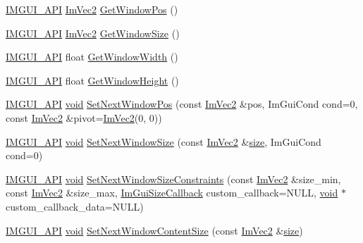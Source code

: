 \begin{DoxyCompactItemize}
\hyperlink{imgui_8h_a43829975e84e45d1149597467a14bbf5}{I\+M\+G\+U\+I\+\_\+\+A\+PI} \hyperlink{structImVec2}{Im\+Vec2} \hyperlink{namespaceImGui_a413d939f3ef416a47d6e5b48be955146}{Get\+Window\+Pos} ()
\item 
\hyperlink{imgui_8h_a43829975e84e45d1149597467a14bbf5}{I\+M\+G\+U\+I\+\_\+\+A\+PI} \hyperlink{structImVec2}{Im\+Vec2} \hyperlink{namespaceImGui_aaa5c0bfac7125ba9850a08b6db2e90c9}{Get\+Window\+Size} ()
\item 
\hyperlink{imgui_8h_a43829975e84e45d1149597467a14bbf5}{I\+M\+G\+U\+I\+\_\+\+A\+PI} float \hyperlink{namespaceImGui_a471ff23945b99541c506dbdc2a9004cf}{Get\+Window\+Width} ()
\item 
\hyperlink{imgui_8h_a43829975e84e45d1149597467a14bbf5}{I\+M\+G\+U\+I\+\_\+\+A\+PI} float \hyperlink{namespaceImGui_a44d2bfb80e0d2dd232a553ab29a91b52}{Get\+Window\+Height} ()
\item 
\hyperlink{imgui_8h_a43829975e84e45d1149597467a14bbf5}{I\+M\+G\+U\+I\+\_\+\+A\+PI} \hyperlink{imgui__impl__opengl3__loader_8h_ac668e7cffd9e2e9cfee428b9b2f34fa7}{void} \hyperlink{namespaceImGui_afbccd31113430670b5ab2bf0d6f509bf}{Set\+Next\+Window\+Pos} (const \hyperlink{structImVec2}{Im\+Vec2} \&pos, Im\+Gui\+Cond cond=0, const \hyperlink{structImVec2}{Im\+Vec2} \&pivot=\hyperlink{structImVec2}{Im\+Vec2}(0, 0))
\item 
\hyperlink{imgui_8h_a43829975e84e45d1149597467a14bbf5}{I\+M\+G\+U\+I\+\_\+\+A\+PI} \hyperlink{imgui__impl__opengl3__loader_8h_ac668e7cffd9e2e9cfee428b9b2f34fa7}{void} \hyperlink{namespaceImGui_ab33717bb71ef5e393ae18656fc6b229d}{Set\+Next\+Window\+Size} (const \hyperlink{structImVec2}{Im\+Vec2} \&\hyperlink{imgui__impl__opengl3__loader_8h_a3d1e3edfcf61ca2d831883e1afbad89e}{size}, Im\+Gui\+Cond cond=0)
\item 
\hyperlink{imgui_8h_a43829975e84e45d1149597467a14bbf5}{I\+M\+G\+U\+I\+\_\+\+A\+PI} \hyperlink{imgui__impl__opengl3__loader_8h_ac668e7cffd9e2e9cfee428b9b2f34fa7}{void} \hyperlink{namespaceImGui_a157d5bcc362951e77eb3236864e879ce}{Set\+Next\+Window\+Size\+Constraints} (const \hyperlink{structImVec2}{Im\+Vec2} \&size\+\_\+min, const \hyperlink{structImVec2}{Im\+Vec2} \&size\+\_\+max, \hyperlink{imgui_8h_a1cccf55557c2153a9d4af6db73dc3a91}{Im\+Gui\+Size\+Callback} custom\+\_\+callback=N\+U\+LL, \hyperlink{imgui__impl__opengl3__loader_8h_ac668e7cffd9e2e9cfee428b9b2f34fa7}{void} $\ast$custom\+\_\+callback\+\_\+data=N\+U\+LL)
\item 
\hyperlink{imgui_8h_a43829975e84e45d1149597467a14bbf5}{I\+M\+G\+U\+I\+\_\+\+A\+PI} \hyperlink{imgui__impl__opengl3__loader_8h_ac668e7cffd9e2e9cfee428b9b2f34fa7}{void} \hyperlink{namespaceImGui_aae55a58c38d8e84b10eb1e8b1531372d}{Set\+Next\+Window\+Content\+Size} (const \hyperlink{structImVec2}{Im\+Vec2} \&\hyperlink{imgui__impl__opengl3__loader_8h_a3d1e3edfcf61ca2d831883e1afbad89e}{size})

\end{DoxyCompactItemize}
